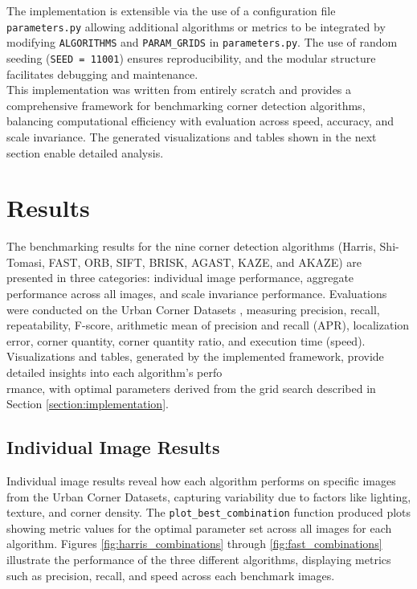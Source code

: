 \documentclass[journal]{IEEEtran}
\begin{document}
The implementation is extensible via the use of a configuration file \texttt{parameters.py} allowing additional algorithms or metrics to be integrated by modifying \texttt{ALGORITHMS} and \texttt{PARAM\_GRIDS} in \texttt{parameters.py}. The use of random seeding (\texttt{SEED = 11001}) ensures reproducibility, and the modular structure facilitates debugging and maintenance.\\

This implementation was written from entirely scratch and provides a comprehensive framework for benchmarking corner detection algorithms, balancing computational efficiency with evaluation across speed, accuracy, and scale invariance. The generated visualizations and tables shown in the next section enable detailed analysis. \\

\section{Results}
\label{section:results}


The benchmarking results for the nine corner detection algorithms (Harris, Shi-Tomasi, FAST, ORB, SIFT, BRISK, AGAST, KAZE, and AKAZE) are presented in three categories: individual image performance, aggregate performance across all images, and scale invariance performance. Evaluations were conducted on the Urban Corner Datasets \cite{Urban_Corner_Dataset}, measuring precision, recall, repeatability, F-score, arithmetic mean of precision and recall (APR), localization error, corner quantity, corner quantity ratio, and execution time (speed). Visualizations and tables, generated by the implemented framework, provide detailed insights into each algorithm’s perfo\\rmance, with optimal parameters derived from the grid search described in Section \ref{section:implementation}.

\subsection{Individual Image Results}
Individual image results reveal how each algorithm performs on specific images from the Urban Corner Datasets, capturing variability due to factors like lighting, texture, and corner density. The \texttt{plot\_best\_combination} function produced plots showing metric values for the optimal parameter set across all images for each algorithm. Figures \ref{fig:harris_combinations} through \ref{fig:fast_combinations} illustrate the performance of the three different algorithms, displaying metrics such as precision, recall, and speed across each benchmark images.\\
\end{document}
